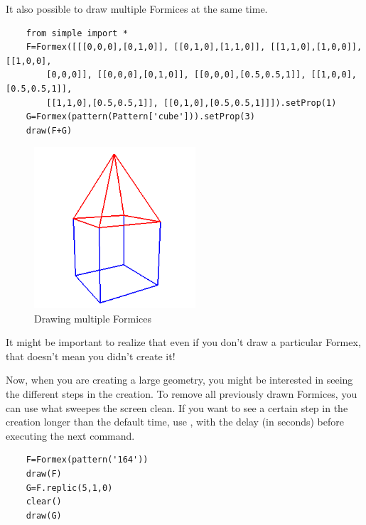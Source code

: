 It also possible to draw multiple Formices at the same time.
\begin{verbatim}
	from simple import *
	F=Formex([[[0,0,0],[0,1,0]], [[0,1,0],[1,1,0]], [[1,1,0],[1,0,0]], [[1,0,0],
		[0,0,0]], [[0,0,0],[0,1,0]], [[0,0,0],[0.5,0.5,1]], [[1,0,0],[0.5,0.5,1]], 
		[[1,1,0],[0.5,0.5,1]], [[0,1,0],[0.5,0.5,1]]]).setProp(1)	
	G=Formex(pattern(Pattern['cube'])).setProp(3)
	draw(F+G)
\end{verbatim}
\begin{figure}[ht]
  \centering
  \begin{makeimage}
  \end{makeimage}
  \begin{latexonly}
    \includegraphics[width=6cm]{images/house}
  \end{latexonly}
  \begin{htmlonly}
  \end{htmlonly}  
  \caption{Drawing multiple Formices}
  \label{fig:multiple}
\end{figure}
 
It might be important to realize that even if you don't draw a particular Formex, that doesn't mean you didn't create it!

Now, when you are creating a large geometry, you might be interested in seeing the different steps in the creation. To remove all previously drawn Formices, you can use   what sweepes the screen clean. If you want to see a certain step in the creation longer than the default time, use , with  the delay (in seconds) before executing the next command.
\begin{verbatim}
	F=Formex(pattern('164'))
	draw(F)
	G=F.replic(5,1,0)
	clear()
	draw(G)
\end{verbatim}


